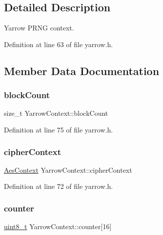 \subsection{Detailed Description}
Yarrow P\+R\+NG context. 

Definition at line 63 of file yarrow.\+h.



\subsection{Member Data Documentation}
\mbox{\label{structYarrowContext_a4884396418346045041cd7cf33e81082}} 
\subsubsection{\texorpdfstring{block\+Count}{blockCount}}
{\footnotesize\ttfamily size\+\_\+t Yarrow\+Context\+::block\+Count}



Definition at line 75 of file yarrow.\+h.

\mbox{\label{structYarrowContext_a20f7d783d0cbf6427551cd60f6a4b13d}} 
\subsubsection{\texorpdfstring{cipher\+Context}{cipherContext}}
{\footnotesize\ttfamily \hyperlink{structAesContext}{Aes\+Context} Yarrow\+Context\+::cipher\+Context}



Definition at line 72 of file yarrow.\+h.

\mbox{\label{structYarrowContext_a38d6c27182707d79f9479a60934972ba}} 
\subsubsection{\texorpdfstring{counter}{counter}}
{\footnotesize\ttfamily \hyperlink{stdint_8h_aba7bc1797add20fe3efdf37ced1182c5}{uint8\+\_\+t} Yarrow\+Context\+::counter\mbox{[}16\mbox{]}}



